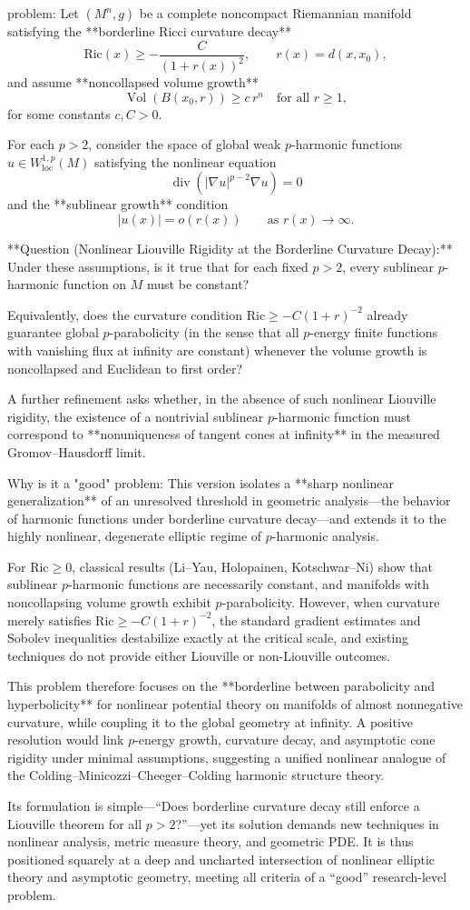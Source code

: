 problem:  
Let \( (M^n, g) \) be a complete noncompact Riemannian manifold satisfying the **borderline Ricci curvature decay**
\[
\mathrm{Ric}(x) \ge -\frac{C}{(1+r(x))^2}, \qquad r(x) = d(x,x_0),
\]
and assume **noncollapsed volume growth**
\[
\operatorname{Vol}(B(x_0,r)) \ge c\,r^n \quad \text{for all } r\ge1,
\]
for some constants \(c, C>0\).  

For each \(p>2\), consider the space of global weak \(p\)-harmonic functions \(u \in W^{1,p}_{\mathrm{loc}}(M)\) satisfying the nonlinear equation
\[
\operatorname{div}(|\nabla u|^{p-2}\nabla u) = 0
\]
and the **sublinear growth** condition
\[
|u(x)| = o(r(x)) \qquad \text{as } r(x)\to\infty.
\]

**Question (Nonlinear Liouville Rigidity at the Borderline Curvature Decay):**  
Under these assumptions, is it true that for each fixed \(p>2\), every sublinear \(p\)-harmonic function on \(M\) must be constant?  

Equivalently, does the curvature condition \(\mathrm{Ric}\ge -C(1+r)^{-2}\) already guarantee global \(p\)-parabolicity (in the sense that all \(p\)-energy finite functions with vanishing flux at infinity are constant) whenever the volume growth is noncollapsed and Euclidean to first order?  

A further refinement asks whether, in the absence of such nonlinear Liouville rigidity, the existence of a nontrivial sublinear \(p\)-harmonic function must correspond to **nonuniqueness of tangent cones at infinity** in the measured Gromov–Hausdorff limit.

Why is it a "good" problem:  
This version isolates a **sharp nonlinear generalization** of an unresolved threshold in geometric analysis—the behavior of harmonic functions under borderline curvature decay—and extends it to the highly nonlinear, degenerate elliptic regime of \(p\)-harmonic analysis.  

For \(\mathrm{Ric}\ge0\), classical results (Li–Yau, Holopainen, Kotschwar–Ni) show that sublinear \(p\)-harmonic functions are necessarily constant, and manifolds with noncollapsing volume growth exhibit \(p\)-parabolicity. However, when curvature merely satisfies \(\mathrm{Ric}\ge -C(1+r)^{-2}\), the standard gradient estimates and Sobolev inequalities destabilize exactly at the critical scale, and existing techniques do not provide either Liouville or non-Liouville outcomes.  

This problem therefore focuses on the **borderline between parabolicity and hyperbolicity** for nonlinear potential theory on manifolds of almost nonnegative curvature, while coupling it to the global geometry at infinity. A positive resolution would link \(p\)-energy growth, curvature decay, and asymptotic cone rigidity under minimal assumptions, suggesting a unified nonlinear analogue of the Colding–Minicozzi–Cheeger–Colding harmonic structure theory.  

Its formulation is simple—“Does borderline curvature decay still enforce a Liouville theorem for all \(p>2\)?”—yet its solution demands new techniques in nonlinear analysis, metric measure theory, and geometric PDE.  It is thus positioned squarely at a deep and uncharted intersection of nonlinear elliptic theory and asymptotic geometry, meeting all criteria of a “good” research-level problem.